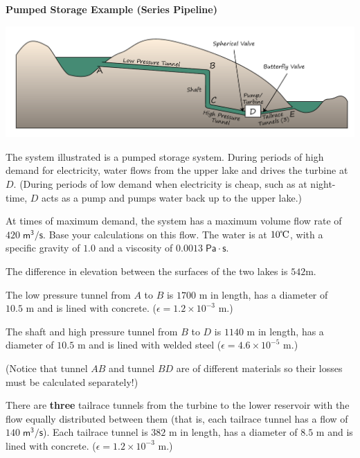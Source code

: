 \documentclass[10pt,oneside]{amsart}
\begin{document}
\thispagestyle{empty}









\newpage
\textbf{Pumped Storage Example  (Series Pipeline)}

\begin{center}
	\includegraphics[scale=0.7]{../../figs/07SeriesPipeline/pumpedStorage}
\end{center}

The system illustrated is a pumped storage system. During periods of high demand for electricity, water flows from the
upper lake and drives the turbine at $D$. (During periods of low demand when electricity is cheap, such as at
night-time, $D$ acts as a pump and pumps water back up to the upper lake.)
\par\medskip
At times of maximum demand, the system has a maximum volume flow rate of $420\;\mathsf{m^3/s}$. Base your
calculations on this flow. The water is at $10\text{\textcelsius}$, with a specific gravity of $1.0$ and a viscosity
of $0.0013\;\mathsf{Pa\cdot s}$.
\par\medskip
The difference in elevation between the surfaces of the two lakes is $542\text{
	m}$. \par\medskip
The low pressure tunnel from $A$ to $B$ is $1700\text{ m}$ in length, has a diameter of $10.5\text{ m}$
and is lined with concrete. ($\epsilon=1.2\times10^{-3}\text{ m}$.)
\par\medskip
The shaft and high pressure tunnel from $B$ to $D$ is $1140\text{ m}$ in length, has a diameter of $10.5\text{ m}$ and
is lined with welded steel ($\epsilon=4.6\times10^{-5}\text{ m}$.)
\par\medskip
(Notice that tunnel $AB$ and tunnel $BD$ are of different materials so their losses must be calculated separately!)
\par\medskip
There are {\Large\textbf{three}} tailrace tunnels from the turbine to the lower reservoir with the flow equally
distributed between them (that is, each tailrace tunnel has a flow of $140\;\mathsf{m^3/s}$). Each tailrace tunnel is $382\text{ m}$ in
length, has a diameter of $8.5\text{ m}$ and is lined with concrete. ($\epsilon=1.2\times10^{-3}\text{ m}$.)
\end{document}
